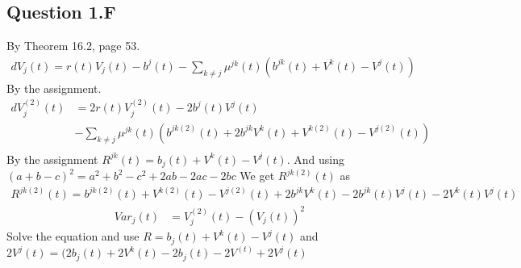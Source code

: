 \documentclass[10pt]{article}
\begin{document}
\subsection{Question 1.F}
By Theorem 16.2, page 53. 
\begin{equation}
\begin{split}
dV_j(t) = r(t)V_j(t) - b^j(t) - \sum_{k \neq j} \mu^{jk}(t) (b^{jk}(t) + V^k(t) - V^j(t))
\end{split}
\end{equation}
By the assignment.
\begin{equation}
\begin{split}
dV_j^{(2)}(t) & = 
 2r(t)V_j^{(2)}(t) - 2b^j(t)V^j(t) \\
 & - \sum_{k \neq j} \mu^{jk}(t) (b^{jk(2)}(t) + 2b^{jk}V^k(t) + V^{k(2)}(t) - V^{j(2)}(t)) \\ 
\end{split}
\end{equation}
By the assignment $R^{jk}(t) = b_j(t) + V^k(t) - V^j(t)$. And using $(a+b-c)^2 = a^2 + b^2 - c^2 + 2ab -2ac - 2bc$ We get $R^{jk(2)}(t)$ as
\begin{equation}
\begin{split}
R^{jk(2)}(t) = b^{jk(2)}(t) + V^{k(2)}(t) - V^{j(2)}(t) + 2b^{jk}V^k(t) - 2b^{jk}(t)V^j(t) - 2V^k(t)V^j(t)
\end{split}
\end{equation}
\begin{equation}
\begin{split}
Var_j(t) & = V_j^{(2)}(t) - (V_j(t))^2
\end{split}
\end{equation}
Solve the equation and use $R = b_j(t) + V^k(t) - V^j(t)$ and $2V^j(t) = (2b_j (t) + 2V^k(t) - 2b_j (t) - 2V^(t) + 2V^j(t) $
\end{document}
